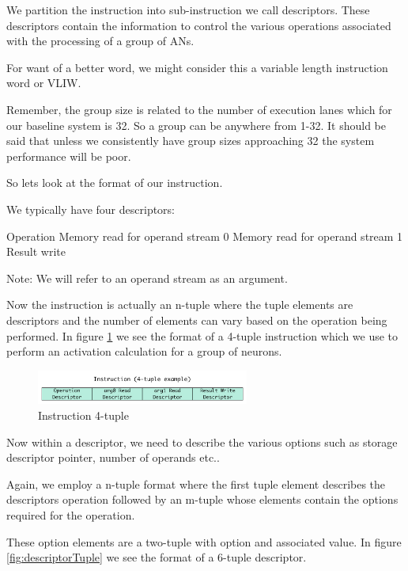 \documentclass[journal]{IEEEtran}
\begin{document}
We partition the instruction into sub-instruction we call descriptors. These descriptors contain the information to control the various operations associated with the processing of a group of ANs.

For want of a better word, we might consider this a variable length instruction word or VLIW.

Remember, the group size is related to the number of execution lanes which for our baseline system is 32. So a group can be anywhere from 1-32. It should be said that unless we consistently have group sizes approaching 32 the system performance will be poor.

So lets look at the format of our instruction.

We typically have four descriptors:

\begin{outline}
\renewcommand{\outlinei}{enumerate}
    \1 Operation
    \1 Memory read for operand stream 0
    \1 Memory read for operand stream 1
    \1 Result write
\end{outline}

Note: We will refer to an operand stream as an argument.

Now the instruction is actually an n-tuple where the tuple elements are descriptors and the number of elements can vary based on the operation being performed. In figure \ref{fig:instructionTuple} we see the format of a 4-tuple instruction which we use to perform an activation calculation for a group of neurons.

\begin{figure}[!t]
\centerline{
\mbox{\includegraphics[width=2.75in]{instructionTuple.jpg}}
}
\caption{Instruction 4-tuple}
\label{fig:instructionTuple}
\end{figure}

Now within a descriptor, we need to describe the various options such as storage descriptor pointer, number of operands etc..

Again, we employ a n-tuple format where the first tuple element describes the descriptors operation followed by an m-tuple whose elements contain the options required for the operation.

These option elements are a two-tuple with option and associated value.
In figure \ref{fig:descriptorTuple} we see the format of a 6-tuple descriptor.
\end{document}

